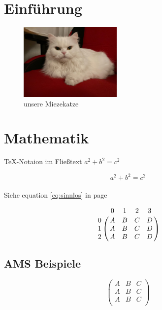 \documentclass[ngerman,12pt]{scrreprt}
\begin{document}
\tableofcontents

\listoftables

\listoffigures



\chapter{Einführung}

\blindtext




\begin{figure} [b]
\begin{center}
\includegraphics[width=5cm]{Katze2}
\caption{unsere Miezekatze}\label{fig:katze}
\end{center}
\end{figure}

\chapter{Mathematik}
TeX-Notaion im Fließtext $a^2 + b^2 = c^2$


\[a^2 + b^2 = c^2\] \\

Siehe equation \ref{eq:sinnlos} in page \pageref{eq:sinnlos}


\[
\bordermatrix{%
  & 0 & 1 & 2 & 3\cr
 0 & A & B & C & D\cr
 1 & A & B & C & D\cr
 2 & A & B & C & D\cr
}
\]



\section{AMS Beispiele}

\begin{equation} \label{eq:sinnlos}
\begin{pmatrix}
A & B & C \\
A & B & C \\
A & B & C \\
\end{pmatrix}
\end{equation}
\end{document}
